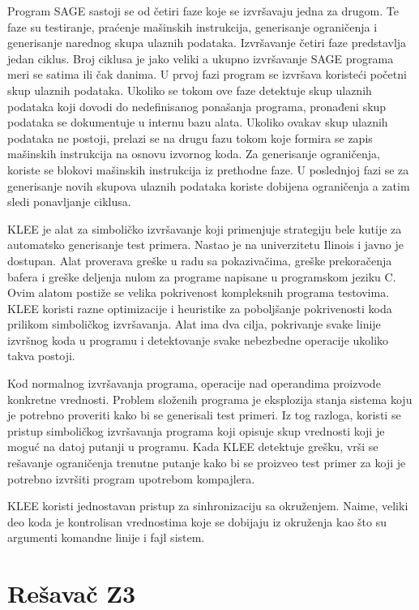 \documentclass[12pt,oneside]{memoir}
\begin{document}
\par
Program SAGE sastoji se od četiri faze koje se izvršavaju jedna za drugom. Te faze su testiranje, praćenje mašinskih instrukcija, generisanje ograničenja i generisanje narednog skupa ulaznih podataka. Izvršavanje četiri faze predstavlja jedan ciklus. Broj ciklusa je jako veliki a ukupno izvršavanje SAGE programa meri se satima ili čak danima. 
U prvoj fazi program se izvršava koristeći početni skup ulaznih podataka. Ukoliko se tokom ove faze detektuje skup ulaznih podataka koji dovodi do nedefinisanog ponašanja programa, pronađeni skup podataka se dokumentuje u internu bazu alata. Ukoliko ovakav skup ulaznih podataka ne postoji, prelazi se na drugu fazu tokom koje formira se zapis mašinskih instrukcija na osnovu izvornog koda. Za generisanje ograničenja, koriste se blokovi mašinskih instrukcija iz prethodne faze. U poslednjoj fazi se za generisanje novih skupova ulaznih podataka koriste dobijena ograničenja a zatim sledi ponavljanje ciklusa. 
\par
KLEE \cite{ToolKLEE} je alat za simboličko izvršavanje \cite{SymbolicExecution} koji primenjuje strategiju bele kutije za automatsko generisanje test primera. 
Nastao je na univerzitetu Ilinois i javno je dostupan.
Alat proverava greške u radu sa pokazivačima, greške prekoračenja bafera i greške deljenja nulom za programe napisane u programskom jeziku C. Ovim alatom postiže se velika pokrivenost kompleksnih programa testovima. KLEE koristi razne optimizacije i heuristike za poboljšanje pokrivenosti koda prilikom simboličkog izvršavanja. Alat ima dva cilja, pokrivanje svake linije izvršnog koda u programu i detektovanje svake nebezbedne operacije ukoliko takva postoji. \par
Kod normalnog izvršavanja programa, operacije nad operandima proizvode konkretne vrednosti. Problem složenih programa je eksplozija stanja sistema koju je potrebno proveriti kako bi se generisali test primeri. Iz tog razloga, koristi se pristup simboličkog izvršavanja programa koji opisuje skup vrednosti koji je moguć na datoj putanji u programu. Kada KLEE detektuje grešku, vrši se rešavanje ograničenja trenutne putanje kako bi se proizveo test primer za koji je potrebno izvršiti program upotrebom kompajlera. 
\par 
KLEE koristi jednostavan pristup za sinhronizaciju sa okruženjem. Naime, veliki deo koda je kontrolisan vrednostima koje se dobijaju iz okruženja kao što su argumenti komandne linije i fajl sistem. 
 
\chapter{Rešavač Z3}
\label{chp:razrada}
\end{document}
